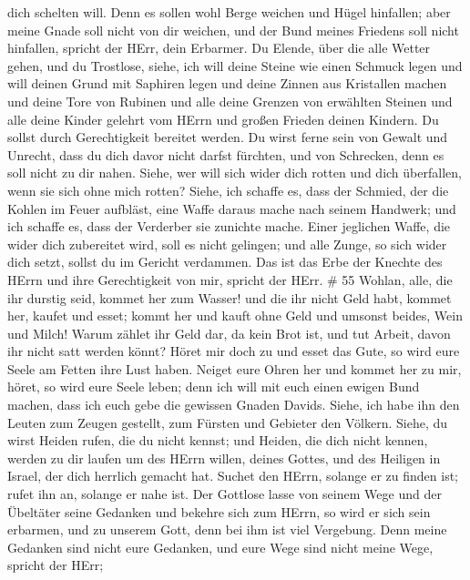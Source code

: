 dich schelten will.  Denn es sollen wohl Berge weichen und
Hügel hinfallen; aber meine Gnade soll nicht von dir weichen, und der
Bund meines Friedens soll nicht hinfallen, spricht der HErr, dein
Erbarmer.  Du Elende, über die alle Wetter gehen, und du
Trostlose, siehe, ich will deine Steine wie einen Schmuck legen und will
deinen Grund mit Saphiren legen  und deine Zinnen aus
Kristallen machen und deine Tore von Rubinen und alle deine Grenzen von
erwählten Steinen  und alle deine Kinder gelehrt vom HErrn
und großen Frieden deinen Kindern.  Du sollst durch
Gerechtigkeit bereitet werden. Du wirst ferne sein von Gewalt und
Unrecht, dass du dich davor nicht darfst fürchten, und von Schrecken,
denn es soll nicht zu dir nahen.  Siehe, wer will sich
wider dich rotten und dich überfallen, wenn sie sich ohne mich rotten?
 Siehe, ich schaffe es, dass der Schmied, der die Kohlen im
Feuer aufbläst, eine Waffe daraus mache nach seinem Handwerk; und ich
schaffe es, dass der Verderber sie zunichte mache.  Einer
jeglichen Waffe, die wider dich zubereitet wird, soll es nicht gelingen;
und alle Zunge, so sich wider dich setzt, sollst du im Gericht
verdammen. Das ist das Erbe der Knechte des HErrn und ihre Gerechtigkeit
von mir, spricht der HErr. \# 55  Wohlan, alle, die ihr
durstig seid, kommet her zum Wasser! und die ihr nicht Geld habt, kommet
her, kaufet und esset; kommt her und kauft ohne Geld und umsonst beides,
Wein und Milch!  Warum zählet ihr Geld dar, da kein Brot
ist, und tut Arbeit, davon ihr nicht satt werden könnt? Höret mir doch
zu und esset das Gute, so wird eure Seele am Fetten ihre Lust haben.
 Neiget eure Ohren her und kommet her zu mir, höret, so wird
eure Seele leben; denn ich will mit euch einen ewigen Bund machen, dass
ich euch gebe die gewissen Gnaden Davids.  Siehe, ich habe
ihn den Leuten zum Zeugen gestellt, zum Fürsten und Gebieter den
Völkern.  Siehe, du wirst Heiden rufen, die du nicht kennst;
und Heiden, die dich nicht kennen, werden zu dir laufen um des HErrn
willen, deines Gottes, und des Heiligen in Israel, der dich herrlich
gemacht hat.  Suchet den HErrn, solange er zu finden ist;
rufet ihn an, solange er nahe ist.  Der Gottlose lasse von
seinem Wege und der Übeltäter seine Gedanken und bekehre sich zum HErrn,
so wird er sich sein erbarmen, und zu unserem Gott, denn bei ihm ist
viel Vergebung.  Denn meine Gedanken sind nicht eure
Gedanken, und eure Wege sind nicht meine Wege, spricht der HErr;
